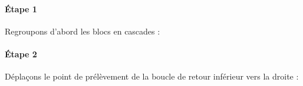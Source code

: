 \paragraph{\'Etape 1}

Regroupons d'abord les blocs en cascades :

\begin{center}                                                                                                                
\end{center}                                                                                                                  

\paragraph{\'Etape 2}

Déplaçons le point de prélèvement de la boucle de retour inférieur vers la droite  : 

